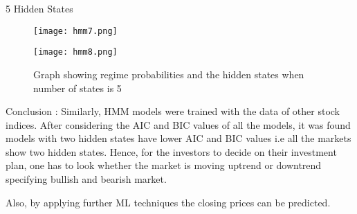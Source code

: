 \documentclass{beamer}
\begin{document}
\begin{frame}{5 Hidden States}
\begin{figure}[H]
\centering
\texttt{[image: hmm7.png]}
\end{figure}
\begin{figure}[H]
\centering
\texttt{[image: hmm8.png]}
\caption{Graph showing regime probabilities and the hidden states when number of states is 5}
\label{fig7}
\end{figure}    
\end{frame}
\begin{frame}{Conclusion :}
    Similarly, HMM models were trained with the data of other stock indices. After considering the AIC and BIC values of all the models, it was found models with two hidden states have lower AIC and BIC values i.e all the markets show two hidden states. Hence, for the investors to decide on their investment plan, one has to look whether the market is moving uptrend or downtrend specifying bullish and bearish market. 

Also, by applying further ML techniques the closing prices can be predicted.

\end{frame}
\end{document}
